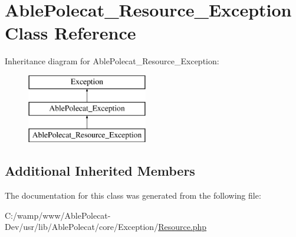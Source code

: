 \hypertarget{class_able_polecat___resource___exception}{}\section{Able\+Polecat\+\_\+\+Resource\+\_\+\+Exception Class Reference}
\label{class_able_polecat___resource___exception}
Inheritance diagram for Able\+Polecat\+\_\+\+Resource\+\_\+\+Exception\+:\begin{figure}[H]
\begin{center}
\leavevmode
\includegraphics[height=3.000000cm]{class_able_polecat___resource___exception}
\end{center}
\end{figure}
\subsection*{Additional Inherited Members}


The documentation for this class was generated from the following file\+:\begin{DoxyCompactItemize}
\item 
C\+:/wamp/www/\+Able\+Polecat-\/\+Dev/usr/lib/\+Able\+Polecat/core/\+Exception/\hyperlink{_exception_2_resource_8php}{Resource.\+php}\end{DoxyCompactItemize}
